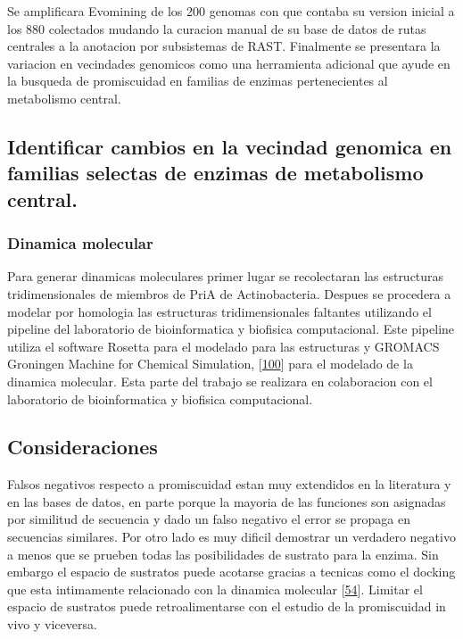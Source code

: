 \documentclass[12pt,twoside]{reedthesis}
\begin{document}
  Se amplificara Evomining de los 200 genomas con que contaba su version
  inicial a los 880 colectados mudando la curacion manual de su base de
  datos de rutas centrales a la anotacion por subsistemas de RAST.
  Finalmente se presentara la variacion en vecindades genomicos como una
  herramienta adicional que ayude en la busqueda de promiscuidad en
  familias de enzimas pertenecientes al metabolismo central.
  
  \subsection{Identificar cambios en la vecindad genomica en familias
  selectas de enzimas de metabolismo
  central.}\label{identificar-cambios-en-la-vecindad-genomica-en-familias-selectas-de-enzimas-de-metabolismo-central.-1}
  
  \subsubsection{Dinamica molecular}\label{dinamica-molecular}
  
  Para generar dinamicas moleculares primer lugar se recolectaran las
  estructuras tridimensionales de miembros de PriA de Actinobacteria.
  Despues se procedera a modelar por homologia las estructuras
  tridimensionales faltantes utilizando el pipeline del laboratorio de
  bioinformatica y biofisica computacional. Este pipeline utiliza el
  software Rosetta para el modelado para las estructuras y GROMACS
  Groningen Machine for Chemical Simulation,
  {[}\protect\hyperlink{ref-van_der_spoel_gromacs_2005}{100}{]} para el
  modelado de la dinamica molecular. Esta parte del trabajo se realizara
  en colaboracion con el laboratorio de bioinformatica y biofisica
  computacional.
  
  \subsection{Consideraciones}\label{consideraciones}
  
  Falsos negativos respecto a promiscuidad estan muy extendidos en la
  literatura y en las bases de datos, en parte porque la mayoria de las
  funciones son asignadas por similitud de secuencia y dado un falso
  negativo el error se propaga en secuencias similares. Por otro lado es
  muy dificil demostrar un verdadero negativo a menos que se prueben todas
  las posibilidades de sustrato para la enzima. Sin embargo el espacio de
  sustratos puede acotarse gracias a tecnicas como el docking que esta
  intimamente relacionado con la dinamica molecular
  {[}\protect\hyperlink{ref-campbell_biophysical_2012}{54}{]}. Limitar el
  espacio de sustratos puede retroalimentarse con el estudio de la
  promiscuidad in vivo y viceversa.
  
\end{document}
